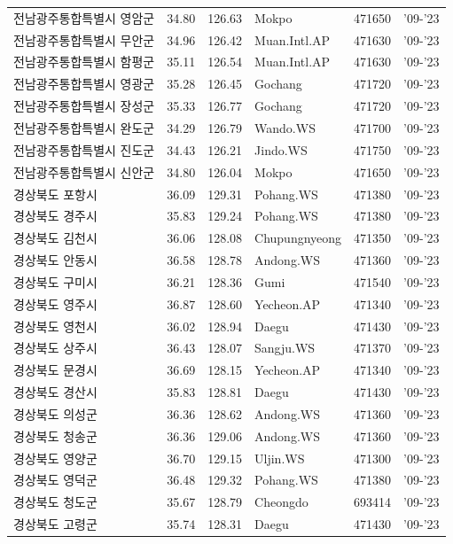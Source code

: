 \begin{longtable}{lcclcc}
  전남광주통합특별시 영암군 & 34.80 & 126.63 & Mokpo & 471650 & '09-'23 \\
  전남광주통합특별시 무안군 & 34.96 & 126.42 & Muan.Intl.AP & 471630 & '09-'23 \\
  전남광주통합특별시 함평군 & 35.11 & 126.54 & Muan.Intl.AP & 471630 & '09-'23 \\
  전남광주통합특별시 영광군 & 35.28 & 126.45 & Gochang & 471720 & '09-'23 \\
  전남광주통합특별시 장성군 & 35.33 & 126.77 & Gochang & 471720 & '09-'23 \\
  전남광주통합특별시 완도군 & 34.29 & 126.79 & Wando.WS & 471700 & '09-'23 \\
  전남광주통합특별시 진도군 & 34.43 & 126.21 & Jindo.WS & 471750 & '09-'23 \\
  전남광주통합특별시 신안군 & 34.80 & 126.04 & Mokpo & 471650 & '09-'23 \\
  경상북도 포항시 & 36.09 & 129.31 & Pohang.WS & 471380 & '09-'23 \\
  경상북도 경주시 & 35.83 & 129.24 & Pohang.WS & 471380 & '09-'23 \\
  경상북도 김천시 & 36.06 & 128.08 & Chupungnyeong & 471350 & '09-'23 \\
  경상북도 안동시 & 36.58 & 128.78 & Andong.WS & 471360 & '09-'23 \\
  경상북도 구미시 & 36.21 & 128.36 & Gumi & 471540 & '09-'23 \\
  경상북도 영주시 & 36.87 & 128.60 & Yecheon.AP & 471340 & '09-'23 \\
  경상북도 영천시 & 36.02 & 128.94 & Daegu & 471430 & '09-'23 \\
  경상북도 상주시 & 36.43 & 128.07 & Sangju.WS & 471370 & '09-'23 \\
  경상북도 문경시 & 36.69 & 128.15 & Yecheon.AP & 471340 & '09-'23 \\
  경상북도 경산시 & 35.83 & 128.81 & Daegu & 471430 & '09-'23 \\
  경상북도 의성군 & 36.36 & 128.62 & Andong.WS & 471360 & '09-'23 \\
  경상북도 청송군 & 36.36 & 129.06 & Andong.WS & 471360 & '09-'23 \\
  경상북도 영양군 & 36.70 & 129.15 & Uljin.WS & 471300 & '09-'23 \\
  경상북도 영덕군 & 36.48 & 129.32 & Pohang.WS & 471380 & '09-'23 \\
  경상북도 청도군 & 35.67 & 128.79 & Cheongdo & 693414 & '09-'23 \\
  경상북도 고령군 & 35.74 & 128.31 & Daegu & 471430 & '09-'23 \\

\end{longtable}
